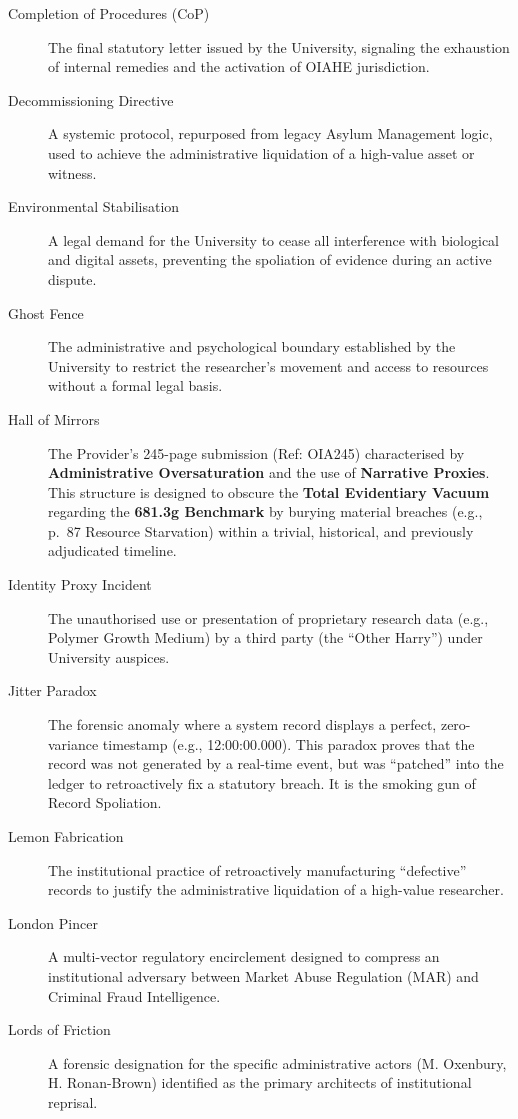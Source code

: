 \documentclass{EMBASSY}
\begin{document}
\begin{description}
	\item[Completion of Procedures (CoP)] The final statutory letter issued by the University, signaling the exhaustion of internal remedies and the activation of OIAHE jurisdiction.
	\item[Decommissioning Directive] A systemic protocol, repurposed from legacy Asylum Management logic, used to achieve the administrative liquidation of a high-value asset or witness.
	\item[Environmental Stabilisation] A legal demand for the University to cease all interference with biological and digital assets, preventing the spoliation of evidence during an active dispute.
	\item[Ghost Fence] The administrative and psychological boundary established by the University to restrict the researcher’s movement and access to resources without a formal legal basis.
	\item[Hall of Mirrors] The Provider's 245-page submission (Ref: OIA245) characterised by \textbf{Administrative Oversaturation} and the use of \textbf{Narrative Proxies}. This structure is designed to obscure the \textbf{Total Evidentiary Vacuum} regarding the \textbf{681.3g Benchmark} by burying material breaches (e.g., p.~87 Resource Starvation) within a trivial, historical, and previously adjudicated timeline.
	\item[Identity Proxy Incident] The unauthorised use or presentation of proprietary research data (e.g., Polymer Growth Medium) by a third party (the ``Other Harry'') under University auspices.
	\item[Jitter Paradox] The forensic anomaly where a system record displays a perfect, zero-variance timestamp (e.g., 12:00:00.000). This paradox proves that the record was not generated by a real-time event, but was ``patched'' into the ledger to retroactively fix a statutory breach. It is the smoking gun of Record Spoliation.
	\item[Lemon Fabrication] The institutional practice of retroactively manufacturing ``defective'' records to justify the administrative liquidation of a high-value researcher.
	\item[London Pincer] A multi-vector regulatory encirclement designed to compress an institutional adversary between Market Abuse Regulation (MAR) and Criminal Fraud Intelligence.
	\item[Lords of Friction] A forensic designation for the specific administrative actors (M. Oxenbury, H. Ronan-Brown) identified as the primary architects of institutional reprisal.

\end{description}
\end{document}
